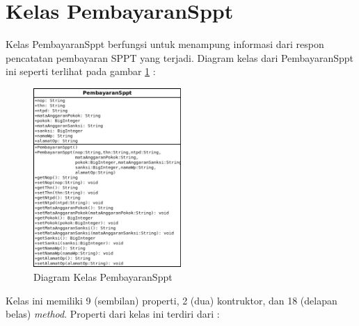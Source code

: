 \section{Kelas PembayaranSppt}

Kelas PembayaranSppt berfungsi untuk menampung informasi dari respon pencatatan pembayaran SPPT yang terjadi. Diagram kelas dari PembayaranSppt ini seperti terlihat pada gambar \ref{fig:uml-class-PembayaranSppt} :

\begin{figure}[H]
  \centering
  \includegraphics[width=0.5\textwidth]{./resources/uml/uml-class-PembayaranSppt}
  \caption{Diagram Kelas PembayaranSppt}
  \label{fig:uml-class-PembayaranSppt}
\end{figure}

Kelas ini memiliki 9 (sembilan) properti, 2 (dua) kontruktor, dan 18 (delapan belas) \textit{method}. Properti dari kelas ini terdiri dari :

